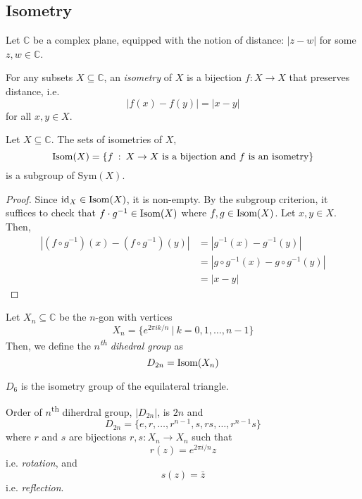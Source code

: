 \documentclass[10pt, a4paper, twoside]{report}
\begin{document}
\subsection{Isometry}
Let \(\mathbb{C}\) be a complex plane, equipped with the notion of distance: \(|z-w|\) for some \(z,w\in\mathbb{C}\). 
\begin{definition}
    For any subsets \(X\subseteq\mathbb{C}\), an \emph{isometry} of \(X\) is a bijection \(f:X\to X\) that preserves distance, i.e.
    \[|f(x)-f(y)|=|x-y|\]
    for all \(x,y\in X\).
\end{definition}
\begin{proposition}
    Let \(X\subseteq\mathbb{C}\). The sets of isometries of \(X\),
    \[\operatorname{Isom}(X)=\{f\::\:X\to X\text{  is a bijection and \(f\) is an isometry}\}\]
    is a subgroup of \(\mathrm{Sym}(X)\).
\end{proposition}
\begin{proof}
    Since \(\operatorname{id}_X\in\operatorname{Isom}(X)\), it is non-empty. By the subgroup criterion, it suffices to check that \(f\cdot g^{-1}\in\operatorname{Isom}(X)\) where \(f,g\in\operatorname{Isom}(X)\). Let \(x,y\in X\). Then,
    \begin{align*}
        |(f\circ g^{-1})(x)-(f\circ g^{-1})(y)|&=|g^{-1}(x)-g^{-1}(y)| \\
        &=|g\circ g^{-1}(x)-g\circ g^{-1}(y)| \\
        &=|x-y|
    \end{align*}
\end{proof}
\begin{definition}
    Let \(X_n\subseteq\mathbb{C}\) be the \(n\)-gon with vertices 
    \[X_n=\{e^{2\pi ik/n}\:|\:k=0,1,\ldots,n-1\}\]
    Then, we define the \emph{\(n\)\textsuperscript{th} dihedral group} as 
    \[D_{2n}=\operatorname{Isom}(X_n)\]
\end{definition}
\begin{example}
    \(D_6\) is the isometry group of the equilateral triangle.
\end{example}
\begin{theorem}
    Order of \(n\)\textsuperscript{th} diherdral group, \(|D_{2n}|\), is \(2n\) and 
    \[D_{2n}=\{e,r,\ldots,r^{n-1},s,rs,\ldots,r^{n-1}s\}\]
    where \(r\) and \(s\) are bijections \(r,s:X_n\to X_n\) such that 
    \[r(z)=e^{2\pi i/n}z\]
    i.e. \emph{rotation}, and 
    \[s(z)=\bar{z}\]
    i.e. \emph{reflection}.
\end{theorem}
\end{document}
